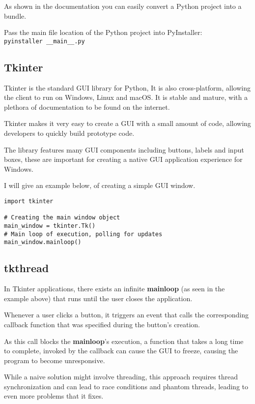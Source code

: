 As shown in the documentation you can easily
convert a Python project into a bundle. \cite{pyinstaller}

Pass the main file location of the Python project into PyInstaller: \\
\texttt{pyinstaller \_\_main\_\_.py}

\subsection{Tkinter}
Tkinter is the standard GUI library for Python,
It is also cross-platform, allowing the client to run on Windows, Linux and macOS.
It is stable and mature, with a plethora of documentation to be found on the internet.

Tkinter makes it very easy to create a GUI with a small amount of code,
allowing developers to quickly build prototype code.

The library features many GUI components including buttons, labels and input boxes,
these are important for creating a native GUI application experience for Windows.

I will give an example below, of creating a simple GUI window.

\begin{lstlisting}
import tkinter

# Creating the main window object
main_window = tkinter.Tk()
# Main loop of execution, polling for updates
main_window.mainloop()
\end{lstlisting}

\subsection{tkthread}
In Tkinter applications, there exists an infinite \textbf{mainloop}
(as seen in the example above)
that runs until the user closes the application.

Whenever a user clicks a button,
it triggers an event that calls the corresponding callback function
that was specified during the button's creation.

As this call blocks the \textbf{mainloop}'s execution,
a function that takes a long time to complete,
invoked by the callback can cause the GUI to freeze,
causing the program to become unresponsive.

While a naive solution might involve threading,
this approach requires thread synchronization and can lead to race conditions
and phantom threads, leading to even more problems that it fixes.


